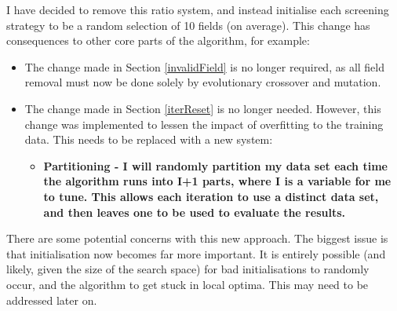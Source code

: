 I have decided to remove this ratio system, and instead initialise each screening strategy to be a random selection of 10 fields (on average). This change has consequences to other core parts of the algorithm, for example:
\begin{itemize}
    \item The change made in Section \ref{invalidField} is no longer required, as all field removal must now be done solely by evolutionary crossover and mutation.
    \item The change made in Section \ref{iterReset} is no longer needed. However, this change was implemented to lessen the impact of overfitting to the training data. This needs to be replaced with a new system:
    \begin{itemize}
        \item \bf Partitioning \rm - I will randomly partition my data set each time the algorithm runs into I+1 parts, where I is a variable for me to tune. This allows each iteration to use a distinct data set, and then leaves one to be used to evaluate the results.
    \end{itemize}
\end{itemize}

There are some potential concerns with this new approach. The biggest issue is that initialisation now becomes far more important. It is entirely possible (and likely, given the size of the search space) for bad initialisations to randomly occur, and the algorithm to get stuck in local optima. This may need to be addressed later on.